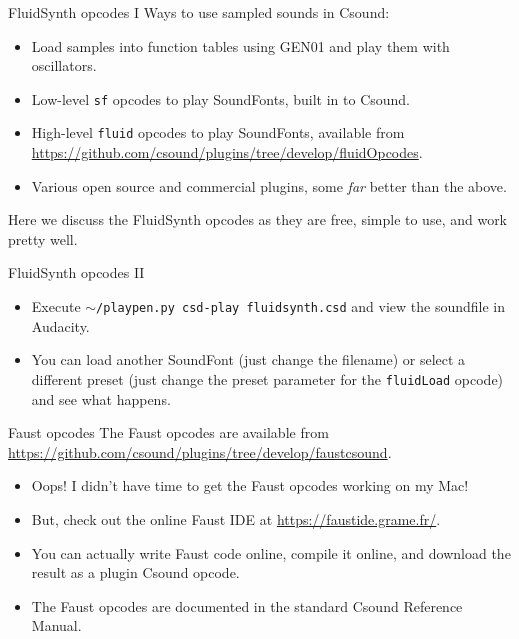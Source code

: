 \documentclass{beamer}
\begin{document}
\begin{frame}{FluidSynth opcodes I}
Ways to use sampled sounds in Csound:
\begin{itemize}
\item Load samples into function tables using GEN01 and play them with oscillators.
\item Low-level \texttt{sf} opcodes to play SoundFonts, built in to Csound.
\item High-level \texttt{fluid} opcodes to play SoundFonts, available from \url{https://github.com/csound/plugins/tree/develop/fluidOpcodes}.
\item Various open source and commercial plugins, some \emph{far} better than the above.
\end{itemize}
Here we discuss the FluidSynth opcodes as they are free,  simple to use, and work pretty well. 
\end{frame}

\begin{frame}{FluidSynth opcodes II}
\begin{example}
\begin{itemize}
\item Execute \texttt{$\sim$/playpen.py csd-play fluidsynth.csd} and view the soundfile in Audacity.
\item You can load another SoundFont (just change the filename) or select a different preset (just change the preset parameter for the \texttt{fluidLoad} opcode) and see what happens.
\end{itemize}
\end{example}
\end{frame}

\begin{frame}{Faust opcodes}
The Faust opcodes are available from \url{https://github.com/csound/plugins/tree/develop/faustcsound}.
\begin{itemize}
\item Oops! I didn't have time to get the Faust opcodes working on my Mac! 
\item But, check out the online Faust IDE at \url{https://faustide.grame.fr/}.
\item You can actually write Faust code online, compile it online, and download the result as a plugin Csound opcode.
\item The Faust opcodes are documented in the standard Csound Reference Manual.
\end{itemize}
\end{frame}
\end{document}
